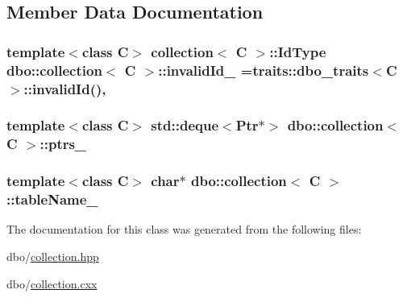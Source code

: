 \subsection{Member Data Documentation}
\hypertarget{classdbo_1_1collection_af3537bd847de5995e84cf83649276001}{
\subsubsection[{invalid\+Id\+\_\+}]{\setlength{\rightskip}{0pt plus 5cm}template$<$class C$>$ {\bf collection}$<$ C $>$\+::{\bf Id\+Type} {\bf dbo\+::collection}$<$ C $>$\+::invalid\+Id\+\_\+ ={\bf traits\+::dbo\+\_\+traits}$<$C$>$\+::invalid\+Id()\hspace{0.3cm}{\ttfamily [static]}, {\ttfamily [protected]}}}\label{classdbo_1_1collection_af3537bd847de5995e84cf83649276001}
\hypertarget{classdbo_1_1collection_a868d7d3bfb98c3a4f739e48043aeaba3}{
\subsubsection[{ptrs\+\_\+}]{\setlength{\rightskip}{0pt plus 5cm}template$<$class C$>$ std\+::deque$<${\bf Ptr}$\ast$$>$ {\bf dbo\+::collection}$<$ C $>$\+::ptrs\+\_\+\hspace{0.3cm}{\ttfamily [protected]}}}\label{classdbo_1_1collection_a868d7d3bfb98c3a4f739e48043aeaba3}
\hypertarget{classdbo_1_1collection_a8b18a6670d28cfc6e6ace16ce62c2609}{
\subsubsection[{table\+Name\+\_\+}]{\setlength{\rightskip}{0pt plus 5cm}template$<$class C$>$ char$\ast$ {\bf dbo\+::collection}$<$ C $>$\+::table\+Name\+\_\+\hspace{0.3cm}{\ttfamily [protected]}}}\label{classdbo_1_1collection_a8b18a6670d28cfc6e6ace16ce62c2609}


The documentation for this class was generated from the following files\+:\begin{DoxyCompactItemize}
\item 
dbo/\hyperlink{collection_8hpp}{collection.\+hpp}\item 
dbo/\hyperlink{collection_8cxx}{collection.\+cxx}\end{DoxyCompactItemize}
